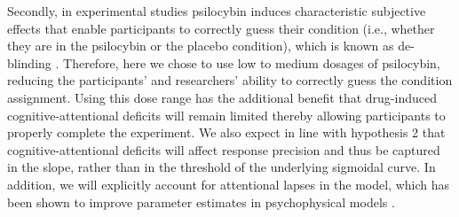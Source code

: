 \documentclass{article}
\begin{document}
Secondly, in experimental studies psilocybin induces characteristic subjective effects that enable participants to correctly guess their condition (i.e., whether they are in the psilocybin or the placebo condition), which is known as de-blinding \parencite{muthukumaraswamy2021blinding}. 
Therefore, here we chose to use low to medium dosages of psilocybin, reducing the participants’ and researchers’ ability to correctly guess the condition assignment.
Using this dose range has the additional benefit that drug-induced cognitive-attentional deficits will remain limited thereby allowing participants to properly complete the experiment.
We also expect in line with hypothesis 2 that cognitive-attentional deficits will affect response precision and thus be captured in the slope, rather than in the threshold of the underlying sigmoidal curve.
In addition, we will explicitly account for attentional lapses in the model, which has been shown to improve parameter estimates in psychophysical models \parencite{wichmann2001psychometricLapse}.
\end{document}
